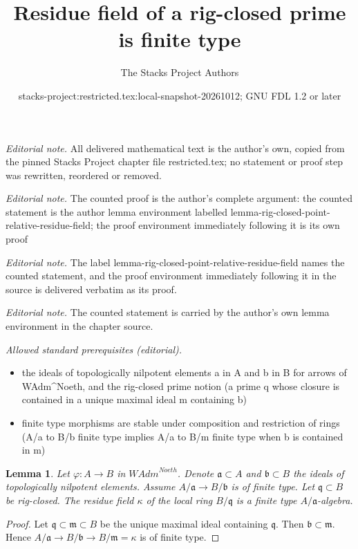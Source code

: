 \documentclass[10pt,a4paper]{amsart}
\title{Residue field of a rig-closed prime is finite type}
\author{The Stacks Project Authors}
\date{stacks-project:restricted.tex:local-snapshot-20261012; GNU FDL 1.2 or later}
\theoremstyle{plain}
\newtheorem{lemma}[subsection]{Lemma}
\theoremstyle{definition}
\theoremstyle{remark}
\numberwithin{equation}{subsection}
\begin{document}
\maketitle
\noindent\textit{Editorial note.} All delivered mathematical text is the author's own, copied from the pinned Stacks Project chapter file restricted.tex; no statement or proof step was rewritten, reordered or removed.\par\medskip
\noindent\textit{Editorial note.} The counted proof is the author's complete argument: the counted statement is the author lemma environment labelled lemma-rig-closed-point-relative-residue-field; the proof environment immediately following it is its own proof\par\medskip
\noindent\textit{Editorial note.} The label lemma-rig-closed-point-relative-residue-field names the counted statement, and the proof environment immediately following it in the source is delivered verbatim as its proof.\par\medskip
\noindent\textit{Editorial note.} The counted statement is carried by the author's own lemma environment in the chapter source.\par\medskip
\noindent\textit{Allowed standard prerequisites (editorial).}\begin{itemize}
\item the ideals of topologically nilpotent elements a in A and b in B for arrows of WAdm\textasciicircum{}Noeth, and the rig-closed prime notion (a prime q whose closure is contained in a unique maximal ideal m containing b)
\item finite type morphisms are stable under composition and restriction of rings (A/a to B/b finite type implies A/a to B/m finite type when b is contained in m)
\end{itemize}\medskip
\begin{lemma}
\label{lemma-rig-closed-point-relative-residue-field}
Let $\varphi : A \to B$ in $\textit{WAdm}^{Noeth}$.
Denote $\mathfrak a \subset A$ and $\mathfrak b \subset B$
the ideals of topologically nilpotent elements. Assume
$A/\mathfrak a \to B/\mathfrak b$ is of finite type.
Let $\mathfrak q \subset B$ be rig-closed.
The residue field $\kappa$ of the local ring $B/\mathfrak q$
is a finite type $A/\mathfrak a$-algebra.
\end{lemma}

\begin{proof}
Let $\mathfrak q \subset \mathfrak m \subset B$ be the unique
maximal ideal containing $\mathfrak q$.
Then $\mathfrak b \subset \mathfrak m$. Hence
$A/\mathfrak a \to B/\mathfrak b \to B/\mathfrak m = \kappa$ is
of finite type.
\end{proof}
\end{document}
